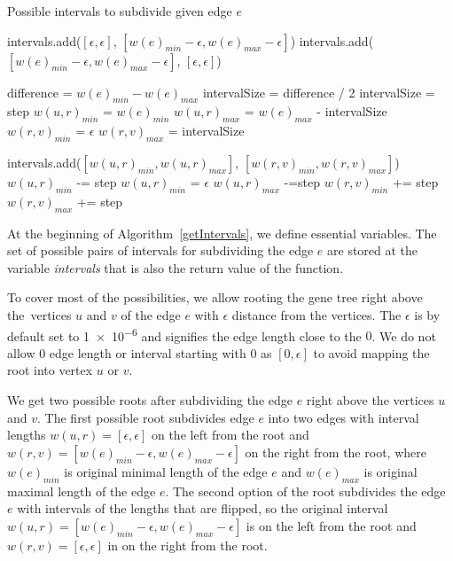 \begin{algorithm}[!htbp]
\caption{Possible intervals to subdivide given edge $e$} 
\label{getIntervals}
\begin{algorithmic}[1]
	\State intervals.add($[ \epsilon, \epsilon ]$, $[ w(e)_{min}-\epsilon, w(e)_{max}-\epsilon ]$) 
	\State intervals.add($[ w(e)_{min}-\epsilon, w(e)_{max}-\epsilon ]$, $[ \epsilon, \epsilon ]$)

	\State difference = $w(e)_{min} - w(e)_{max}$
		\State intervalSize = difference / 2
	\Else
		\State intervalSize = step
	\EndIf
	\State $w(u,r)_{min}$ = $w(e)_{min}$
	\State $w(u,r)_{max}$ = $w(e)_{max}$ - intervalSize
	\State $w(r,v)_{min}$ = $\epsilon$
	\State $w(r,v)_{max}$ = intervalSize
	
		\State intervals.add($[w(u,r)_{min}, w(u,r)_{max}]$, $[w(r,v)_{min},w(r,v)_{max}]$)
		\State $w(u,r)_{min}$ -= step
			\State $w(u,r)_{min}$ = $\epsilon$
		\EndIf
		\State $w(u,r)_{max}$ -=step
		\State $w(r,v)_{min}$ += step
		\State $w(r,v)_{max}$ += step
	\EndWhile

	\EndIf
\EndFunction
\end{algorithmic}
\end{algorithm}

At the beginning of Algorithm~\ref{getIntervals}, we define essential variables. The set of possible pairs of intervals for subdividing the edge $e$ are stored at the variable \emph{intervals} that is also the return value of the function.

To cover most of the possibilities, we allow rooting the gene tree right above the~vertices $u$ and $v$ of the edge $e$ with $\epsilon$ distance from the vertices. The $\epsilon$ is by default set to \num{1e-6} and signifies the edge length close to the $0$. We do not allow $0$ edge length or interval starting with $0$ as $[0, \epsilon]$ to avoid mapping the root into vertex $u$ or $v$.

We get two possible roots after subdividing the edge $e$ right above the vertices $u$ and $v$. The first possible root subdivides edge $e$ into two edges with interval lengths $w(u, r) = [ \epsilon, \epsilon ]$ on the left from the root and $w(r, v) = [ w(e)_{min}-\epsilon, w(e)_{max}-\epsilon ]$ on the right from the root, where $w(e)_{min}$ is original minimal length of the edge $e$ and $w(e)_{max}$ is original maximal length of the edge $e$. The second option of the root subdivides the edge $e$ with intervals of the lengths that are flipped, so the original interval $w(u, r) = [ w(e)_{min}-\epsilon, w(e)_{max}-\epsilon ]$ is on the left from the root and $w(r, v) = [ \epsilon, \epsilon ]$ in on the right from the root.

